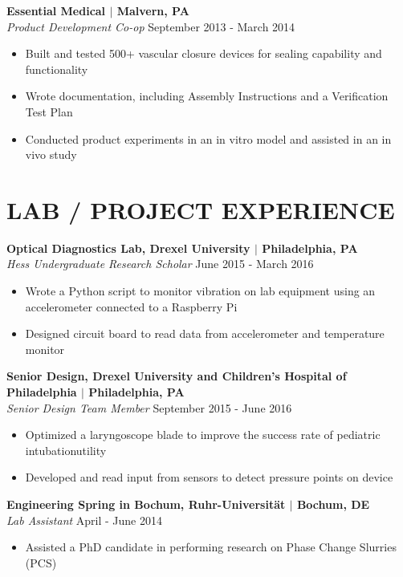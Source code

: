 \documentclass[line,resmargin]{res}
\begin{document}
\begin{resume}
\textbf{Essential Medical $|$ Malvern, PA} \\
{\sl Product Development Co-op} \hfill September 2013 - March 2014
	\begin{itemize} \itemsep -2pt
		\item  Built and tested 500+ vascular closure devices for sealing capability and functionality
		\item  Wrote documentation, including Assembly Instructions and a Verification Test Plan
		\item  Conducted product experiments in an in vitro model and assisted in an in vivo study
	\end{itemize}

\section{LAB / PROJECT EXPERIENCE}
\textbf{Optical Diagnostics Lab, Drexel University $|$ Philadelphia, PA} \\
{\sl Hess Undergraduate Research Scholar} \hfill June 2015 - March 2016
	\begin{itemize}  \itemsep -2pt
		\item  Wrote a Python script to monitor vibration on lab equipment using an accelerometer connected to a Raspberry Pi
		\item  Designed circuit board to read data from accelerometer and temperature monitor
	\end{itemize}

\textbf{Senior Design, Drexel University and Children's Hospital of Philadelphia $|$ Philadelphia, PA} \\
{\sl Senior Design Team Member} \hfill September 2015 - June 2016 \\
\begin{itemize} \itemsep -2pt
	\item  Optimized a laryngoscope blade to improve the success rate of pediatric intubationutility
	\item  Developed and read input from sensors to detect pressure points on device
\end{itemize}

\textbf{Engineering Spring in Bochum, Ruhr-Universit{\"a}t $|$ Bochum, DE} \\
{\sl Lab Assistant} \hfill April - June 2014 \\
\begin{itemize} \itemsep -2pt
	\item  Assisted a PhD candidate in performing research on Phase Change Slurries (PCS)
\end{itemize}

\end{resume}
\end{document}
